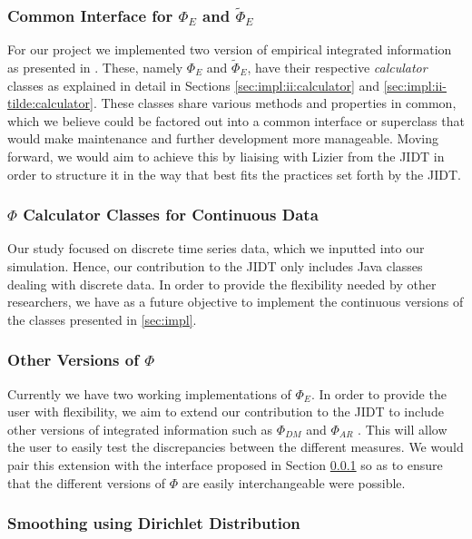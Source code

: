 \documentclass[a4paper,11pt]{article}
\begin{document}
\subsubsection{Common Interface for $\Phi_E$ and $\widetilde{\Phi}_E$}
\label{sec:fw:jidt:interface}
For our project we implemented two version of empirical integrated information as presented in \cite{Barrett2011}. These, namely $\Phi_E$ and $\widetilde{\Phi}_E$, have their respective \textit{calculator} classes as explained in detail in Sections \ref{sec:impl:ii:calculator} and \ref{sec:impl:ii-tilde:calculator}. These classes share various methods and properties in common, which we believe could be factored out into a common interface or superclass that would make maintenance and further development more manageable. Moving forward, we would aim to achieve this by liaising with Lizier from the JIDT in order to structure it in the way that best fits the practices set forth by the JIDT.

\subsubsection{$\Phi$ Calculator Classes for Continuous Data}
\label{sec:fw:jidt:continuous}
Our study focused on discrete time series data, which we inputted into our simulation. Hence, our contribution to the JIDT only includes Java classes dealing with discrete data. In order to provide the flexibility needed by other researchers, we have as a future objective to implement the continuous versions of the classes presented in \ref{sec:impl}.


\subsubsection{Other Versions of $\Phi$}
\label{sec:fw:jidt:other-phi}
Currently we have two working implementations of $\Phi_{E}$. In order to provide the user with flexibility, we aim to extend our contribution to the JIDT to include other versions of integrated information such as $\Phi_{DM}$ and $\Phi_{AR}$ \cite{Barrett2011}. This will allow the user to easily test the discrepancies between the different measures. We would pair this extension with the interface proposed in Section \ref{sec:fw:jidt:interface} so as to ensure that the different versions of $\Phi$ are easily interchangeable were possible.

\subsubsection{Smoothing using Dirichlet Distribution}
\label{sec:fw:jidt:dirichlet}
\end{document}
